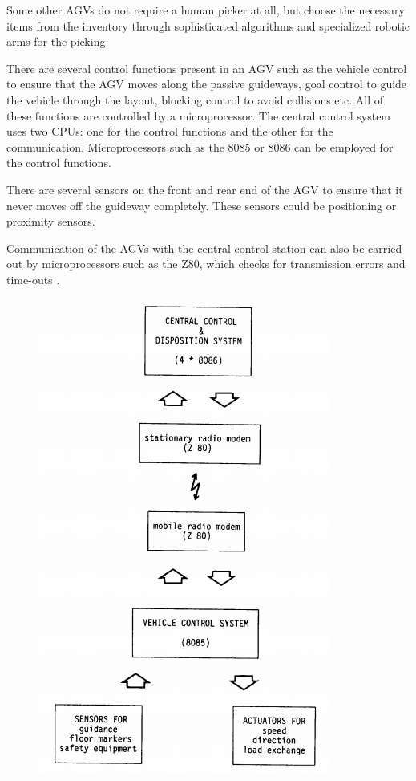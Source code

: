 \documentclass{report}
\begin{document}
\begin{itemize}
    Some other AGVs do not require a human picker at all, but choose the necessary items from the inventory through sophisticated algorithms and specialized robotic arms for the picking.
    
    There are several control functions present in an AGV such as the vehicle control to ensure that the AGV moves along the passive guideways, goal control to guide the vehicle through the layout, blocking control to avoid collisions etc. All of these functions are controlled by a microprocessor. The central control system uses two CPUs: one for the control functions and the other for the communication. Microprocessors such as the 8085 or 8086 can be employed for the control functions.
    
    There are several sensors on the front and rear end of the AGV to ensure that it never moves off the guideway completely. These sensors could be positioning or proximity sensors.
    
    Communication of the AGVs with the central control station can also be carried out by microprocessors such as the Z80, which checks for transmission errors and time-outs \cite{agvmicro}. 
    
    \begin{figure}[H]
    
    \centering
    \includegraphics[scale=0.7]{agvmicro.png}
    \caption{}
    

\end{figure}
\end{itemize}
\end{document}
